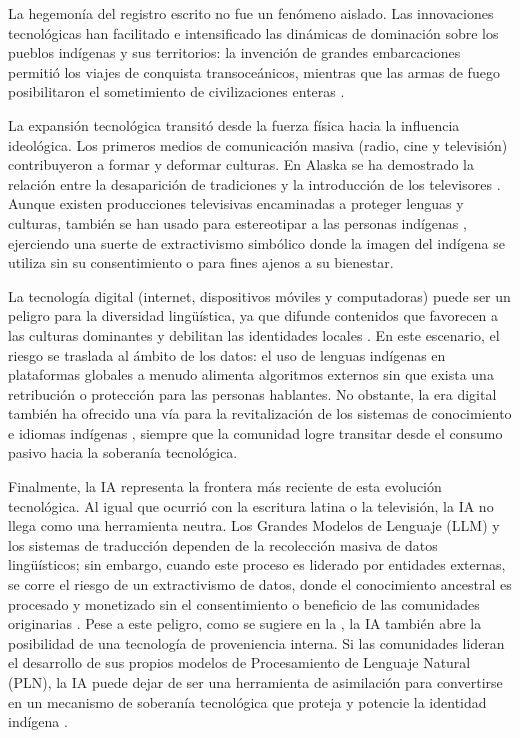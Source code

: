 \documentclass[spanish]{textolivre}
\begin{document}
La hegemonía del registro escrito no fue un fenómeno aislado. Las innovaciones tecnológicas han facilitado e intensificado las dinámicas de dominación sobre los pueblos indígenas y sus territorios: la invención de grandes embarcaciones permitió los viajes de conquista transoceánicos, mientras que las armas de fuego posibilitaron el sometimiento de civilizaciones enteras \cite{MallenRivera2012}.

La expansión tecnológica transitó desde la fuerza física hacia la influencia ideológica. Los primeros medios de comunicación masiva (radio, cine y televisión) contribuyeron a formar y deformar culturas. En Alaska se ha demostrado la relación entre la desaparición de tradiciones y la introducción de los televisores \cite{Cazden2003}. Aunque existen producciones televisivas encaminadas a proteger lenguas y culturas, también se han usado para estereotipar a las personas indígenas \cite{IturriagaAcevedo2020}, ejerciendo una suerte de extractivismo simbólico donde la imagen del indígena se utiliza sin su consentimiento o para fines ajenos a su bienestar.

La tecnología digital (internet, dispositivos móviles y computadoras) puede ser un peligro para la diversidad lingüística, ya que difunde contenidos que favorecen a las culturas dominantes y debilitan las identidades locales \cite{AlvarezAvila2016,GarcesVelasquez2020,LlanesOrtiz2023}. En este escenario, el riesgo se traslada al ámbito de los datos: el uso de lenguas indígenas en plataformas globales a menudo alimenta algoritmos externos sin que exista una retribución o protección para las personas hablantes. No obstante, la era digital también ha ofrecido una vía para la revitalización de los sistemas de conocimiento e idiomas indígenas \cite{Ajani2024}, siempre que la comunidad logre transitar desde el consumo pasivo hacia la soberanía tecnológica.

Finalmente, la IA representa la frontera más reciente de esta evolución tecnológica. Al igual que ocurrió con la escritura latina o la televisión, la IA no llega como una herramienta neutra. Los Grandes Modelos de Lenguaje (LLM) y los sistemas de traducción dependen de la recolección masiva de datos lingüísticos; sin embargo, cuando este proceso es liderado por entidades externas, se corre el riesgo de un extractivismo de datos, donde el conocimiento ancestral es procesado y monetizado sin el consentimiento o beneficio de las comunidades originarias \cite{Mager2018}. Pese a este peligro, como se sugiere en la , la IA también abre la posibilidad de una tecnología de proveniencia interna. Si las comunidades lideran el desarrollo de sus propios modelos de Procesamiento de Lenguaje Natural (PLN), la IA puede dejar de ser una herramienta de asimilación para convertirse en un mecanismo de soberanía tecnológica que proteja y potencie la identidad indígena \cite{Joshi2020}.
\end{document}
